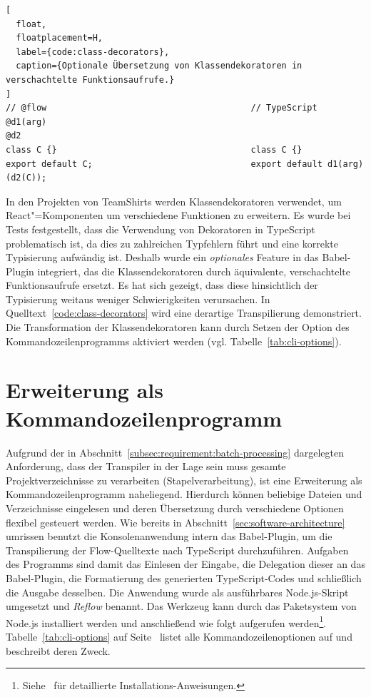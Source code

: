 {\begin{lstlisting}[
  float,
  floatplacement=H,
  label={code:class-decorators},
  caption={Optionale Übersetzung von Klassendekoratoren in verschachtelte Funktionsaufrufe.}
]
// @flow                                        // TypeScript
@d1(arg)
@d2
class C {}                                      class C {}
export default C;                               export default d1(arg)(d2(C));
\end{lstlisting}

In den Projekten von TeamShirts werden Klassendekoratoren verwendet, um React"=Komponenten um verschiedene Funktionen zu erweitern. Es wurde bei Tests festgestellt, dass die Verwendung von Dekoratoren in TypeScript problematisch ist, da dies zu zahlreichen Typfehlern führt und eine korrekte Typisierung aufwändig ist. Deshalb wurde ein \emph{optionales} Feature in das Babel-Plugin integriert, das die Klassendekoratoren durch äquivalente, verschachtelte Funktionsaufrufe ersetzt. Es hat sich gezeigt, dass diese hinsichtlich der Typisierung weitaus weniger Schwierigkeiten verursachen. In Quelltext~\ref{code:class-decorators} wird eine derartige Transpilierung demonstriert. Die Transformation der Klassendekoratoren kann durch Setzen der Option  des Kommandozeilenprogramms aktiviert werden (vgl. Tabelle~\ref{tab:cli-options}).

\section{Erweiterung als Kommandozeilenprogramm}
\label{sec:cli-program}

Aufgrund der in Abschnitt~\ref{subsec:requirement:batch-processing} dargelegten Anforderung, dass der Transpiler in der Lage sein muss gesamte Projektverzeichnisse zu verarbeiten (Stapelverarbeitung), ist eine Erweiterung als Kommandozeilenprogramm naheliegend. Hierdurch können beliebige Dateien und Verzeichnisse eingelesen und deren Übersetzung durch verschiedene Optionen flexibel gesteuert werden. Wie bereits in Abschnitt~\ref{sec:software-architecture} umrissen benutzt die Konsolenanwendung intern das Babel-Plugin, um die Transpilierung der Flow-Quelltexte nach TypeScript durchzuführen. Aufgaben des Programms sind damit das Einlesen der Eingabe, die Delegation dieser an das Babel-Plugin, die Formatierung des generierten TypeScript-Codes und schließlich die Ausgabe desselben.
Die Anwendung wurde als ausführbares Node.js-Skript umgesetzt und \textit{Reflow} benannt. Das Werkzeug kann durch das Paketsystem von Node.js installiert werden und anschließend wie folgt aufgerufen werden\footnote{Siehe~\autocite{REFLOW_GITHUB} für detaillierte Installations-Anweisungen.}. Tabelle~\ref{tab:cli-options} auf Seite~\pageref{tab:cli-options} listet alle Kommandozeilenoptionen auf und beschreibt deren Zweck.

}
